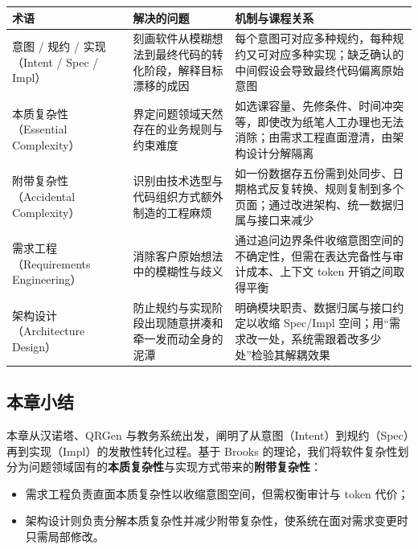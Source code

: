 \documentclass[UTF8,a4paper,11pt,fontset=fandol]{ctexart}
\begin{document}
\begin{center}\small\begin{tabularx}{\linewidth}{YYY}

\toprule

术语 & 解决的问题 & 机制与课程关系\\\midrule

意图 / 规约 / 实现（Intent / Spec / Impl） & 刻画软件从模糊想法到最终代码的转化阶段，解释目标漂移的成因 & 每个意图可对应多种规约，每种规约又可对应多种实现；缺乏确认的中间假设会导致最终代码偏离原始意图\\[3pt]

本质复杂性（Essential Complexity） & 界定问题领域天然存在的业务规则与约束难度 & 如选课容量、先修条件、时间冲突等，即使改为纸笔人工办理也无法消除；由需求工程直面澄清，由架构设计分解隔离\\[3pt]

附带复杂性（Accidental Complexity） & 识别由技术选型与代码组织方式额外制造的工程麻烦 & 如一份数据存五份需到处同步、日期格式反复转换、规则复制到多个页面；通过改进架构、统一数据归属与接口来减少\\[3pt]

需求工程（Requirements Engineering） & 消除客户原始想法中的模糊性与歧义 & 通过追问边界条件收缩意图空间的不确定性，但需在表达完备性与审计成本、上下文 token 开销之间取得平衡\\[3pt]

架构设计（Architecture Design） & 防止规约与实现阶段出现随意拼凑和牵一发而动全身的泥潭 & 明确模块职责、数据归属与接口约定以收缩 Spec/Impl 空间；用“需求改一处，系统需跟着改多少处”检验其解耦效果\\[3pt]

\bottomrule\end{tabularx}\end{center}

\subsection{本章小结}

本章从汉诺塔、QRGen 与教务系统出发，阐明了从意图（Intent）到规约（Spec）再到实现（Impl）的发散性转化过程。基于 Brooks 的理论，我们将软件复杂性划分为问题领域固有的\textbf{本质复杂性}与实现方式带来的\textbf{附带复杂性}：

\begin{itemize}
\item 需求工程负责直面本质复杂性以收缩意图空间，但需权衡审计与 token 代价；

\item 架构设计则负责分解本质复杂性并减少附带复杂性，使系统在面对需求变更时只需局部修改。
\end{itemize}
\end{document}
